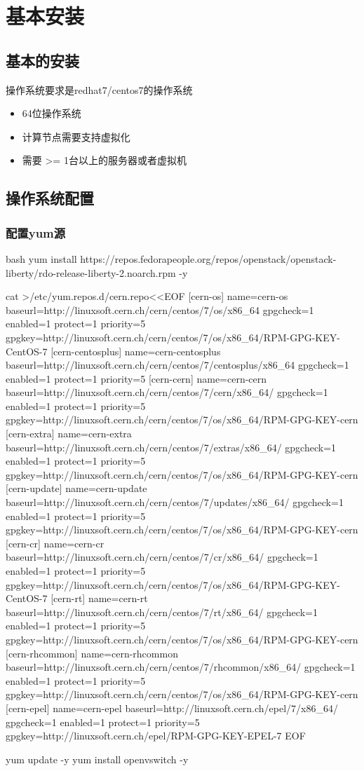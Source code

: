 \chapter{基本安装}
\section{基本的安装}

操作系统要求是redhat7/centos7的操作系统
\begin{itemize}
  \item 64位操作系统
  \item 计算节点需要支持虚拟化
  \item 需要 >= 1台以上的服务器或者虚拟机
\end{itemize}

\section{操作系统配置}
\subsection{配置yum源}

\begin{long-block}{bash}
yum install https://repos.fedorapeople.org/repos/openstack/openstack-liberty/rdo-release-liberty-2.noarch.rpm -y

cat >/etc/yum.repos.d/cern.repo<<EOF
[cern-os]
name=cern-os
baseurl=http://linuxsoft.cern.ch/cern/centos/7/os/x86_64
gpgcheck=1
enabled=1
protect=1
priority=5
gpgkey=http://linuxsoft.cern.ch/cern/centos/7/os/x86_64/RPM-GPG-KEY-CentOS-7
[cern-centosplus]
name=cern-centosplus
baseurl=http://linuxsoft.cern.ch/cern/centos/7/centosplus/x86_64
gpgcheck=1
enabled=1
protect=1
priority=5
[cern-cern]
name=cern-cern
baseurl=http://linuxsoft.cern.ch/cern/centos/7/cern/x86_64/
gpgcheck=1
enabled=1
protect=1
priority=5
gpgkey=http://linuxsoft.cern.ch/cern/centos/7/os/x86_64/RPM-GPG-KEY-cern
[cern-extra]
name=cern-extra
baseurl=http://linuxsoft.cern.ch/cern/centos/7/extras/x86_64/
gpgcheck=1
enabled=1
protect=1
priority=5
gpgkey=http://linuxsoft.cern.ch/cern/centos/7/os/x86_64/RPM-GPG-KEY-cern
[cern-update]
name=cern-update
baseurl=http://linuxsoft.cern.ch/cern/centos/7/updates/x86_64/
gpgcheck=1
enabled=1
protect=1
priority=5
gpgkey=http://linuxsoft.cern.ch/cern/centos/7/os/x86_64/RPM-GPG-KEY-cern
[cern-cr]
name=cern-cr
baseurl=http://linuxsoft.cern.ch/cern/centos/7/cr/x86_64/
gpgcheck=1
enabled=1
protect=1
priority=5
gpgkey=http://linuxsoft.cern.ch/cern/centos/7/os/x86_64/RPM-GPG-KEY-CentOS-7
[cern-rt]
name=cern-rt
baseurl=http://linuxsoft.cern.ch/cern/centos/7/rt/x86_64/
gpgcheck=1
enabled=1
protect=1
priority=5
gpgkey=http://linuxsoft.cern.ch/cern/centos/7/os/x86_64/RPM-GPG-KEY-cern
[cern-rhcommon]
name=cern-rhcommon
baseurl=http://linuxsoft.cern.ch/cern/centos/7/rhcommon/x86_64/
gpgcheck=1
enabled=1
protect=1
priority=5
gpgkey=http://linuxsoft.cern.ch/cern/centos/7/os/x86_64/RPM-GPG-KEY-cern
[cern-epel]
name=cern-epel
baseurl=http://linuxsoft.cern.ch/epel/7/x86_64/
gpgcheck=1
enabled=1
protect=1
priority=5
gpgkey=http://linuxsoft.cern.ch/epel/RPM-GPG-KEY-EPEL-7
EOF

yum update -y
yum install openvswitch -y
\end{long-block}

